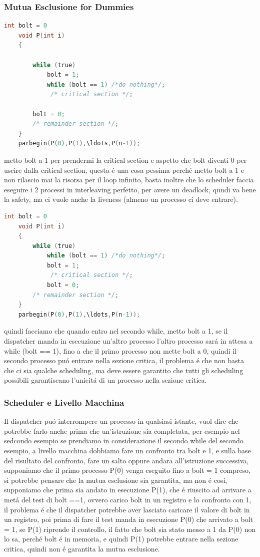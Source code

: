 \subsubsection*{Mutua Esclusione for Dummies}
\begin{lstlisting}[language=C]
    int bolt = 0
    void P(int i)
    {

        while (true)
            bolt = 1;
            while (bolt == 1) /*do nothing*/;
             /* critical section */;

        bolt = 0;
        /* remainder section */;
    }
    parbegin(P(0),P(1),\ldots,P(n-1));
\end{lstlisting}
metto bolt a 1 per prendermi la critical section e aspetto che bolt diventi 0 per uscire dalla critical section, questa é una cosa pessima perché
metto bolt a 1 e non rilascio mai la risorsa per il loop infinito, basta inoltre che lo scheduler faccia eseguire i 2 processi in interleaving perfetto, per avere un deadlock, qundi
va bene la safety, ma ci vuole anche la liveness (almeno un processo ci deve entrare).
\begin{lstlisting}[language=C]
    int bolt = 0
    void P(int i)
    {
        while (true)
            while (bolt == 1) /*do nothing*/;
            bolt = 1;
             /* critical section */;
            bolt = 0;
        /* remainder section */;
    }
    parbegin(P(0),P(1),\ldots,P(n-1));

\end{lstlisting}
quindi facciamo che quando entro nel secondo while, metto bolt a 1, se il dispatcher manda in esecuzione un'altro processo l'altro processo sará in attesa a while (bolt == 1), fino a che
il primo processo non mette bolt a 0, quindi il secondo processo puó entrare nella sezione critica, il problema é che non basta che ci sia qualche scheduling, ma deve essere garantito che
tutti gli scheduling possibili garantiscano l'unicitá di un processo nella sezione critica.
\subsubsection*{Scheduler e Livello Macchina}
Il dispatcher puó interrompere un processo in qualsiasi istante, vuol dire che potrebbe farlo anche prima che un'istruzione sia completata, per esempio nel sedcondo esempio se prendiamo in considerazione
il secondo while del secondo esempio, a livello macchina dobbiamo fare un confronto tra bolt e 1, e sulla base del risultato del confronto, fare un salto oppure andara all'istruzione successiva, supponiamo
che il primo processo P(0) venga eseguito fino a bolt = 1 compreso, si potrebbe pensare che la mutua esclusione sia garantita, ma non é cosí, supponiamo che prima
sia andato in esecuzione P(1), che é riuscito ad arrivare a metá del test di bolt ==1, ovvero carico bolt in un registro e lo confronto con 1, il problema é che
il dispatcher potrebbe aver lasciato caricare il valore di bolt in un registro, poi prima di fare il test manda in esecuzione P(0) che arrivato a bolt = 1, se P(1) riprende
il controllo, il fatto che bolt sia stato messo a 1 da P(0) non lo sa, perché bolt é in memoria, e quindi P(1) potrebbe entrare nella sezione critica, quindi non é garantita la mutua esclusione.
